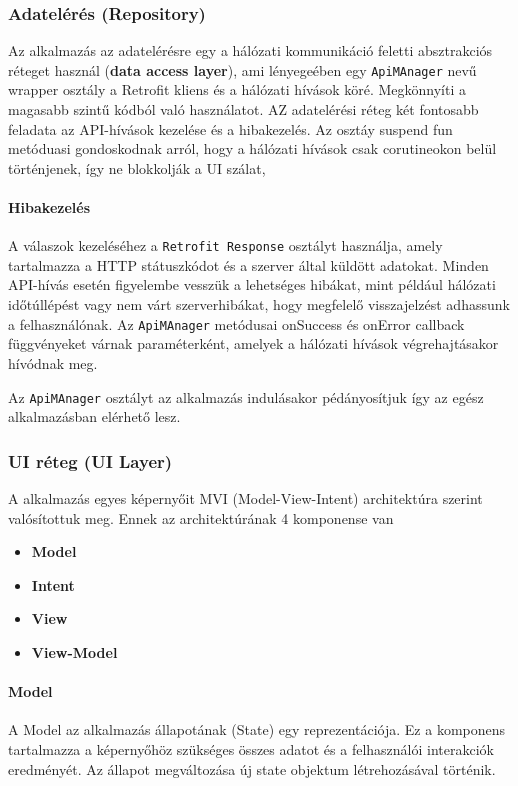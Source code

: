 \subsubsection{Adatelérés (Repository)}

Az alkalmazás az adatelérésre egy a hálózati kommunikáció feletti absztrakciós réteget használ (\textbf{data access layer}), 
ami lényegeében egy \texttt{ApiMAnager} nevű wrapper osztály a Retrofit kliens és a hálózati hívások köré. Megkönnyíti a magasabb szintű kódból való használatot.
AZ adatelérési réteg két fontosabb feladata az API-hívások kezelése és a hibakezelés.
Az osztáy suspend fun metóduasi gondoskodnak arról,
hogy a hálózati hívások csak corutineokon belül történjenek, így ne blokkolják a UI szálat,
\paragraph{Hibakezelés} A válaszok kezeléséhez a \texttt{Retrofit Response} osztályt használja, 
amely tartalmazza a HTTP státuszkódot és a szerver által küldött adatokat. 
Minden API-hívás esetén figyelembe vesszük a lehetséges hibákat, mint például hálózati időtúllépést vagy nem várt szerverhibákat, 
hogy megfelelő visszajelzést adhassunk a felhasználónak. Az \texttt{ApiMAnager} metódusai onSuccess és onError callback 
függvényeket várnak paraméterként, amelyek a hálózati hívások végrehajtásakor hívódnak meg.

Az \texttt{ApiMAnager} osztályt az alkalmazás indulásakor pédányosítjuk így az egész alkalmazásban elérhető lesz.


\subsubsection{UI réteg (UI Layer)}

A alkalmazás egyes képernyőit MVI (Model-View-Intent) architektúra szerint valósítottuk meg.
Ennek az architektúrának 4 komponense van
\begin{itemize}
    \item \textbf{Model} 
    \item \textbf{Intent} 
    \item \textbf{View} 
    \item \textbf{View-Model}
\end{itemize}

\paragraph{Model}
A Model az alkalmazás állapotának (State) egy reprezentációja. Ez a komponens tartalmazza a képernyőhöz 
szükséges összes adatot és a felhasználói interakciók eredményét. 
Az állapot megváltozása új state objektum létrehozásával történik.

